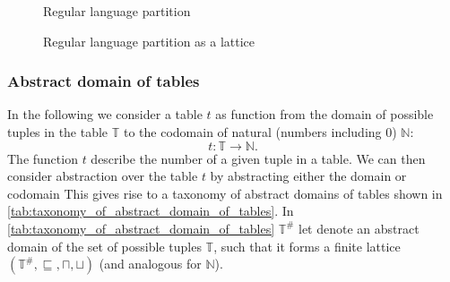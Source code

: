 \begin{figure}
    \center
    \caption{Regular language partition}
    \label{fig:tikz-reg-partition}
\end{figure}


\begin{figure}[!htb]
    \center
    \caption{Regular language partition as a lattice}
    \label{fig:tikz-reg-partition-lattice}
\end{figure}

\subsubsection{Abstract domain of tables}\label{subsubsec:abstract_domain_of_tables}

In the following we consider a table $t$ as function from the domain of possible tuples in the table $\mathbb{T}$ to the codomain of natural (numbers including $0$) $\mathbb{N}$:
\begin{equation}
    t : \mathbb{T} \rightarrow \mathbb{N}.
\end{equation}
The function $t$ describe the number of a given tuple in a table.
We can then consider abstraction over the table $t$ by abstracting either the domain or codomain
This gives rise to a taxonomy of abstract domains of tables shown in \autoref{tab:taxonomy_of_abstract_domain_of_tables}.
In \autoref{tab:taxonomy_of_abstract_domain_of_tables} $\mathbb{T}^\#$ let denote an abstract domain of the set of possible tuples $\mathbb{T}$, such that it forms a finite lattice $(\mathbb{T}^\#, \sqsubseteq, \sqcap, \sqcup)$ (and analogous for $\mathbb{N}$).


